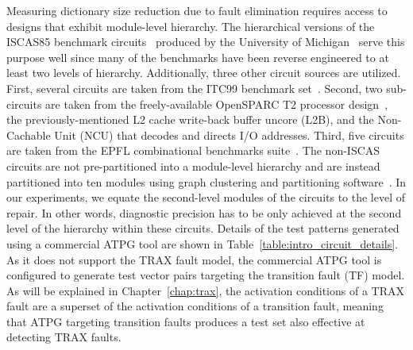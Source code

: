 Measuring dictionary size reduction due to fault elimination requires access to designs that exhibit module-level hierarchy.
%
The hierarchical versions of the ISCAS85 benchmark circuits~\cite{brglez85} produced by the University of Michigan~\cite{hansen99} serve this purpose well since many of the benchmarks have been reverse engineered to at least two levels of hierarchy.
%
Additionally, three other circuit sources are utilized.
%
First, several circuits are taken from the ITC99 benchmark set~\cite{corno99}.
%
Second, two sub-circuits are taken from the freely-available OpenSPARC T2 processor design~\cite{sun11}, the previously-mentioned L2 cache write-back buffer uncore (L2B), and the Non-Cachable Unit (NCU) that decodes and directs I/O addresses.
%
Third, five circuits are taken from the EPFL combinational benchmarks suite~\cite{epfl}.
%
The non-ISCAS circuits are not pre-partitioned into a module-level hierarchy and are instead partitioned into ten modules using graph clustering and partitioning software~\cite{dhillon07}.
%
In our experiments, we equate the second-level modules of the circuits to the level of repair.
%
In other words, diagnostic precision has to be only achieved at the second level of the hierarchy within these circuits.
%
Details of the test patterns generated using a commercial ATPG tool are shown in Table~\ref{table:intro_circuit_details}.
%
As it does not support the TRAX fault model, the commercial ATPG tool is configured to generate test vector pairs targeting the transition fault (TF) model.
%
As will be explained in Chapter~\ref{chap:trax}, the activation conditions of a TRAX fault are a superset of the activation conditions of a transition fault, meaning that ATPG targeting transition faults produces a test set also effective at detecting TRAX faults.

